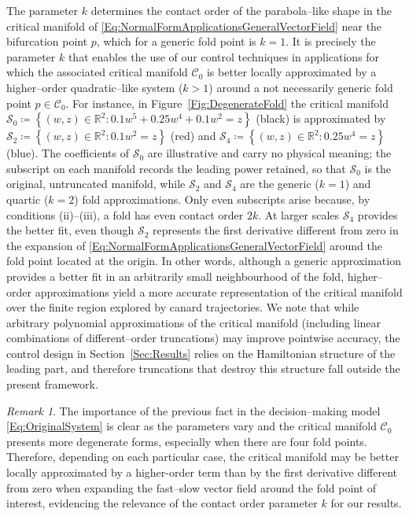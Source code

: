 \documentclass[3p]{elsarticle}
\theoremstyle{plain}
\theoremstyle{remark}
\newtheorem{remark}{Remark}
\theoremstyle{definition}
\begin{document}
The parameter $k$ determines the contact order of the parabola--like shape in the
critical manifold of \eqref{Eq:NormalFormApplicationsGeneralVectorField} near the
bifurcation point $p$, which for a generic fold point is $k=1$. It is precisely the
parameter $k$ that enables the use of our control techniques in applications for
which the associated critical manifold $\mathcal{C}_{0}$ is better locally approximated by
a higher--order quadratic--like system ($k>1$) around a not necessarily generic fold point
$p\in\mathcal{C}_{0}$. For instance, in Figure~\ref{Fig:DegenerateFold} the critical
manifold $\mathcal{S}_{0}\coloneqq\left\{ (w,z)\in\mathbb{R}^{2}: 0.1w^{5} + 0.25w^{4} +
0.1w^{2} = z \right\}$ (black) is approximated by $\mathcal{S}_{2}\coloneqq\left\{ (w,z)
\in \mathbb{R}^{2}: 0.1w^{2} = z \right\}$ (red) and $\mathcal{S}_{4}\coloneqq\left\{ (w,z)
\in \mathbb{R}^{2}: 0.25w^{4} = z \right\}$ (blue). The coefficients of
$\mathcal{S}_{0}$ are illustrative and carry no physical meaning; the subscript on each
manifold records the leading power retained, so that $\mathcal{S}_{0}$ is the original,
untruncated manifold, while $\mathcal{S}_{2}$ and $\mathcal{S}_{4}$ are the generic
($k=1$) and quartic ($k=2$) fold approximations. Only even subscripts arise because, by
conditions (ii)--(iii), a fold has even contact order $2k$.
At larger scales $\mathcal{S}_{4}$ provides the better fit, even though $\mathcal{S}_{2}$
represents the first derivative different from zero in the expansion of
\eqref{Eq:NormalFormApplicationsGeneralVectorField} around the fold point located at the
origin. In other words, although a generic approximation provides a better fit in an
arbitrarily small neighbourhood of the fold, higher--order approximations yield a more
accurate representation of the critical manifold over the finite region explored by canard
trajectories. We note that while arbitrary polynomial approximations of the critical
manifold (including linear combinations of different--order truncations) may improve
pointwise accuracy, the control design in Section~\ref{Sec:Results} relies on the
Hamiltonian structure of the leading part, and therefore truncations that destroy this
structure fall outside the present framework.
    \begin{remark}
        The importance of the previous fact in the decision--making model \eqref{Eq:OriginalSystem} is clear as the parameters vary and the critical manifold $\mathcal{C}_{0}$ presents more degenerate forms, especially when there are four fold points. 
        Therefore, depending on each particular case, the critical manifold may be better locally approximated by a higher-order term than by the first derivative different from zero when expanding the fast--slow vector field around the fold point of interest, evidencing the relevance of the contact order parameter $k$ for our results.
    \end{remark}
 
\end{document}

